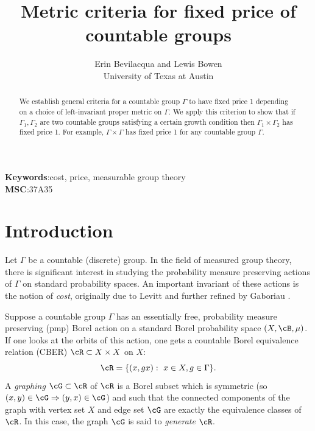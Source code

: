 \documentclass[12pt]{article}
\theoremstyle{plain}
\theoremstyle{definition}
\theoremstyle{remark}
\newcommand{\G}{\Gamma}
\begin{document}
\title{Metric criteria for fixed price of countable groups}
\author{Erin Bevilacqua and Lewis Bowen\\ University of Texas at Austin}
\maketitle

\begin{abstract}
We establish general criteria for a countable group $\G$ to have fixed price 1 depending on a choice of left-invariant proper metric on $\G$. We apply this criterion to show that if $\G_1,\G_2$ are two countable groups satisfying a certain growth condition then $\G_1\times \G_2$ has fixed price 1. For example, $\G\times \G$ has fixed price 1 for any countable group $\G$. 
\end{abstract}

\noindent
{\bf Keywords}:cost, price, measurable group theory\\
{\bf MSC}:37A35\\

\noindent
\tableofcontents


\section{Introduction}

Let $\Gamma$ be a countable (discrete) group. In the field of measured group theory, there is significant interest in studying the probability measure preserving actions of $\Gamma$ on standard probability spaces. An important invariant of these actions is the notion of \textit{cost}, originally due to Levitt \cite{MR1366313} and further refined by Gaboriau \cite{gaboriau-cost}. 

Suppose a countable group $\Gamma$ has an essentially free, probability measure preserving (pmp) Borel action on a standard Borel probability space $(X, \cB, \mu)$. If one looks at the orbits of this action, one gets a countable Borel equivalence relation (CBER) $\cR \subset X \times X$ on $X$:
$$\cR=\{(x,gx):~x\in X, g\in \G\}.$$
A \textit{graphing} $\cG \subset \cR$ of $\cR$ is a Borel subset which is symmetric (so $(x,y) \in \cG \Rightarrow (y,x)\in \cG$) and such that the connected components of the graph with vertex set $X$ and edge set $\cG$ are exactly the equivalence classes of $\cR$. In this case, the graph $\cG$ is said to \textit{generate} $\cR$.
\end{document}

